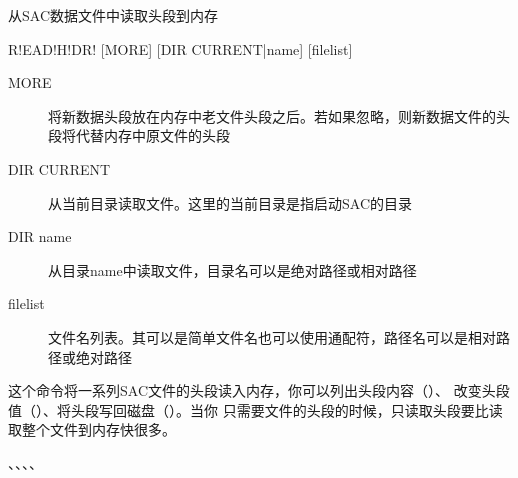 \label{cmd:readhdr}

从SAC数据文件中读取头段到内存

\begin{SACSTX}
R!EAD!H!DR! [MORE] [DIR CURRENT|name] [filelist]
\end{SACSTX}

\begin{description}
\item [MORE] 将新数据头段放在内存中老文件头段之后。若如果忽略，则新数据文件的头段将代替内存中原文件的头段
\item [DIR CURRENT] 从当前目录读取文件。这里的当前目录是指启动SAC的目录
\item [DIR name] 从目录name中读取文件，目录名可以是绝对路径或相对路径
\item [filelist] 文件名列表。其可以是简单文件名也可以使用通配符，路径名可以是相对路径或绝对路径
\end{description}

这个命令将一系列SAC文件的头段读入内存，你可以列出头段内容（）、
改变头段值（）、将头段写回磁盘（）。当你
只需要文件的头段的时候，只读取头段要比读取整个文件到内存快很多。

、、、、
